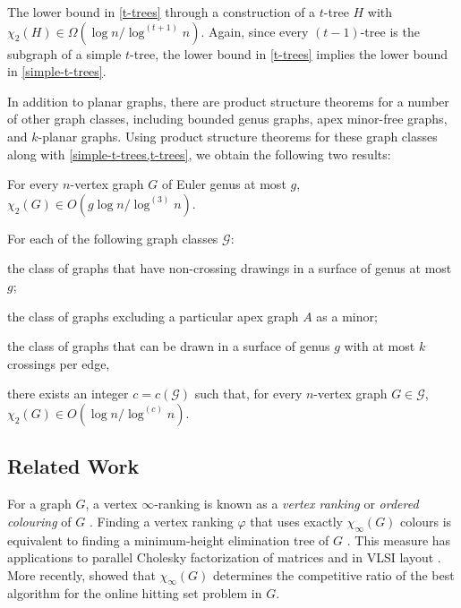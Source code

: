 \documentclass[kpfonts]{patmorin}
\newcommand{\trn}{\chi_2}
\theoremstyle{named}
\begin{document}
The lower bound in \cref{t-trees} through a construction of a $t$-tree $H$ with
$\trn(H)\in\Omega(\log n/\log^{(t+1)} n)$.  Again, since every $(t-1)$-tree is the subgraph of a simple $t$-tree, the lower bound in \cref{t-trees} implies the lower bound in \cref{simple-t-trees}.

In addition to planar graphs, there are product structure theorems for a number of other graph classes, including bounded genus graphs, apex minor-free graphs, and $k$-planar graphs.  Using product structure theorems for these graph classes along with \cref{simple-t-trees,t-trees}, we obtain the following two results:

\begin{thm}\label{bounded-genus}
    For every $n$-vertex graph $G$ of Euler genus at most $g$, $\trn(G)\in O(g\log n/\log^{(3)} n)$.
\end{thm}

\begin{thm}\label{meta-theorem}\label{meta}
    For each of the following graph classes $\mathcal{G}$:
    \begin{compactenum}
        \item the class of graphs that have non-crossing drawings in a surface of genus at most $g$;
        \item the class of graphs excluding a particular apex graph $A$ as a minor;
        \item the class of graphs that can be drawn in a surface of genus $g$ with at most $k$ crossings per edge,
    \end{compactenum}
    there exists an integer $c=c(\mathcal{G})$ such that, for every $n$-vertex graph $G\in\mathcal{G}$, $\trn(G)\in O(\log n/\log^{(c)} n)$.
\end{thm}

\subsection{Related Work}

For a graph $G$, a vertex $\infty$-ranking is known as a \emph{vertex ranking} \cite{bodlaender.deogun.ea:rankings} or \emph{ordered colouring} of $G$ \cite{katchalski.mccuaig.ea:ordered}.  Finding a vertex ranking $\varphi$ that uses exactly $\chi_\infty(G)$ colours is equivalent to finding a minimum-height elimination tree of $G$ \cite{torre.greenlaw.ea:optimal,deogun.kloks.ea:on}.  This measure has applications to parallel Cholesky factorization of matrices \cite{bodlaender.gilbert.ea:approximating,duff.reid:multifrontal,liu:role,dereniowski.kubale:cholesky} and in VLSI layout \cite{leiserson:area,sen.deng.ea:on}.  More recently, \citet{even.smorodinsky:hitting} showed that $\chi_\infty(G)$ determines the competitive ratio of the best algorithm for the online hitting set problem in $G$.
\end{document}
